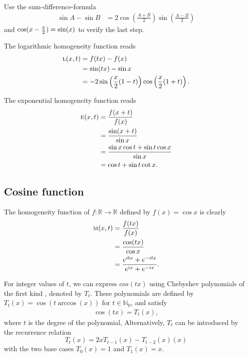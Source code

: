 \documentclass{amsart}
\makeatletter
\theoremstyle{plain}
\numberwithin{equation}{section}
\def\pi{\Greekmath 0119 }%
\def\FindBoldGroup{%
   {\setbox0=\hbox{$\mathbf{x\global\edef\theboldgroup{\the\mathgroup}}$}}%
}
\def\Greekmath#1#2#3#4{%
    \if@compatibility
        \ifnum\mathgroup=\symbold
           \mathchoice{\mbox{\boldmath$\displaystyle\mathchar"#1#2#3#4$}}%
                      {\mbox{\boldmath$\textstyle\mathchar"#1#2#3#4$}}%
                      {\mbox{\boldmath$\scriptstyle\mathchar"#1#2#3#4$}}%
                      {\mbox{\boldmath$\scriptscriptstyle\mathchar"#1#2#3#4$}}%
        \else
           \mathchar"#1#2#3#4%
        \fi 
    \else 
        \FindBoldGroup
        \ifnum\mathgroup=\theboldgroup %
           \mathchoice{\mbox{\boldmath$\displaystyle\mathchar"#1#2#3#4$}}%
                      {\mbox{\boldmath$\textstyle\mathchar"#1#2#3#4$}}%
                      {\mbox{\boldmath$\scriptstyle\mathchar"#1#2#3#4$}}%
                      {\mbox{\boldmath$\scriptscriptstyle\mathchar"#1#2#3#4$}}%
        \else
           \mathchar"#1#2#3#4%
        \fi     	    
	  \fi}
\newcommand{\eh}{\textsc{e}}
\newcommand{\R}{{\mathbb{R}}}
\newcommand{\N}{{\mathbb{N}}}
\makeatother
\begin{document}
Use the sum-difference-formula
\begin{align*}
\sin{A}-\sin{B}
&=
2\cos{\left(\frac{A+B}{2}\right)}
\sin{\left(\frac{A-B}{2}\right)} 
\end{align*}
and $\cos(x-\frac{\pi}{2})=\sin(x)$ to verify the last step.


The logarithmic homogeneity function reads
\begin{align*}
\textsc{l}(x,t)&=f(tx)-f(x)\\
&=\sin(tx)-\sin{x}\\
&= -2 \sin\left(\frac{x}{2}(1-t)\right) \cos\left(\frac{x}{2}(1+t)\right).
\end{align*}

The exponential homogeneity function reads
\begin{align*}
\eh(x,t)&=\frac{f(x+t)}{f(x)}\\
&=\frac{\sin(x+t)}{\sin{x}}\\
&=\frac{\sin{x}\cos{t} + \sin{t} \cos{x}}{\sin{x}}\\
&= \cos{t}+ \sin{t} \cot{x}.
\end{align*}


\subsection{Cosine function}
The homogeneity function of $f:\R \to \R$ defined by $f(x)=\cos{x}$
is clearly
\begin{align*}
\textsc{m}(x,t)&=\frac{f(tx)}{f(x)}\\
&=\frac{\cos(tx)}{\cos{x}}\\
&=\frac{e^{i tx} + e^{-i tx}}{e^{ix}+ e^{-i x}}.
\end{align*}

For integer values of $t$, 
we can express $cos(tx)$ using Chebyshev polynomials of the first kind \cite{LiuDas2025}, denoted by $T_t$.
These polynomials are defined by $T_t (x) = \cos(t \arccos(x) )$ for $t \in \N_0$, 
and satisfy
\begin{align*}
\cos(tx) = T_t (x),
\end{align*}
where $t$ is the degree of the polynomial, 
Alternatively,  $T_t$ can be introduced
by the recurrence relation
\begin{equation*}
T_t(x) 
= 2x T_{t-1}(x)
-
 T_{t-2}(x) (x)
\end{equation*}
with the two base cases $T_0 (x)=1$ and $T_1 (x)=x$.
\end{document}
